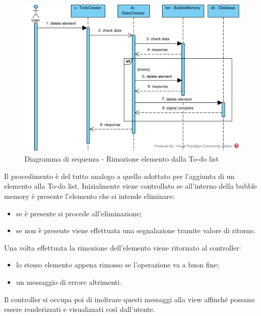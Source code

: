 \begin{figure}[H]
	\centering
	\includegraphics[width=14cm]{../../documenti/SpecificaTecnica/diagrammi_img/sequenza/todo_rimuovi_elemento.png}
	\caption{Diagramma di sequenza - Rimozione elemento dalla To-do list}
\end{figure}
Il procedimento è del tutto analogo a quello adottato per l'aggiunta di un elemento alla To-do list. Inizialmente viene controllato se all'interno della bubble memory è presente l'elemento che si intende eliminare: 
\begin{itemize}
	\item se è presente si procede all'eliminazione;
	\item se non è presente viene effettuata una segnalazione tramite valore di ritorno.
\end{itemize}
Una volta effettuata la rimozione dell'elemento viene ritornato al controller:
\begin{itemize}
	\item lo stesso elemento appena rimosso se l'operazione va a buon fine;
	\item un messaggio di errore altrimenti.
\end{itemize}
Il controller si occupa poi di inoltrare questi messaggi alla view affinché possano essere renderizzati e visualizzati così dall'utente.

